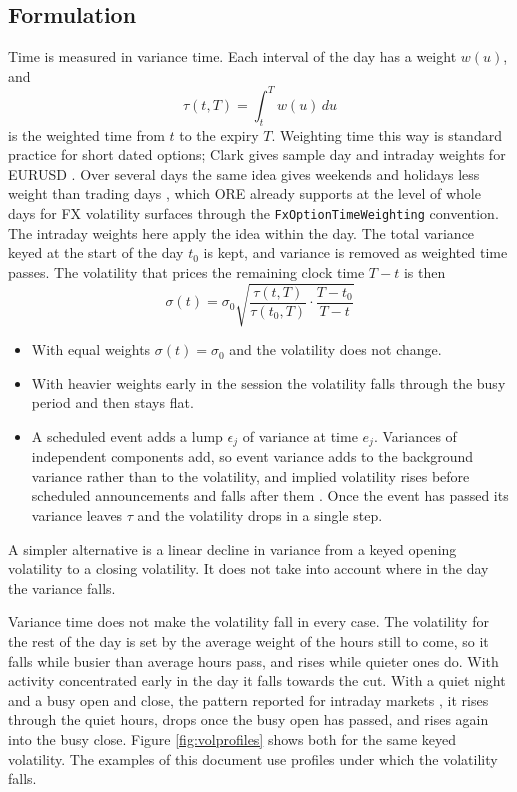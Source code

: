 \documentclass[12pt, a4paper]{article}
\begin{document}
\subsection{Formulation}\label{sec:decay-formulation}

Time is measured in variance time. Each interval of the day has a weight $w(u)$, and
\begin{equation}
\tau(t, T) = \int_t^T w(u)\, du
\end{equation}
is the weighted time from $t$ to the expiry $T$. Weighting time this way is standard practice for short dated
options; Clark gives sample day and intraday weights for EURUSD \cite{clark2011}. Over several days the same idea gives
weekends and holidays less weight than trading days \cite{moontower, globalcapital}, which ORE already supports at the
level of whole days for FX volatility surfaces through the \texttt{FxOptionTimeWeighting} convention. The intraday
weights here apply the idea within the day. The total variance keyed at the start of the day $t_0$ is kept, and
variance is removed as weighted time passes. The volatility that prices the remaining clock time $T - t$ is then
\begin{equation}
\sigma(t) = \sigma_0 \sqrt{\frac{\tau(t, T)}{\tau(t_0, T)} \cdot \frac{T - t_0}{T - t}}
\end{equation}

\begin{itemize}
\item With equal weights $\sigma(t) = \sigma_0$ and the volatility does not change.
\item With heavier weights early in the session the volatility falls through the busy period and then stays flat.
\item A scheduled event adds a lump $\epsilon_j$ of variance at time $e_j$. Variances of independent components add,
  so event variance adds to the background variance rather than to the volatility, and implied volatility rises
  before scheduled announcements and falls after them \cite{wright2020}. Once the event has passed its variance leaves
  $\tau$ and the volatility drops in a single step.
\end{itemize}

A simpler alternative is a linear decline in variance from a keyed opening volatility to a closing volatility. It does
not take into account where in the day the variance falls.

Variance time does not make the volatility fall in every case. The volatility for the rest of the day is set by the
average weight of the hours still to come, so it falls while busier than average hours pass, and rises while quieter
ones do. With activity concentrated early in the day it falls towards the cut. With a quiet night and a busy open and
close, the pattern reported for intraday markets \cite{andersen1997}, it rises through the quiet hours, drops once the
busy open has passed, and rises again into the busy close. Figure \ref{fig:volprofiles} shows both for the same keyed
volatility. The examples of this document use profiles under which the volatility falls.
\end{document}
